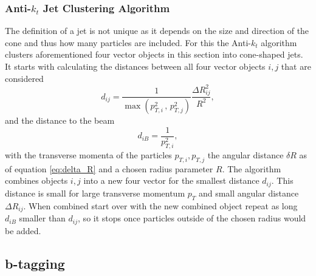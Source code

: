 \subsubsection*{Anti-$k_t$ Jet Clustering Algorithm}
The definition of a jet is not unique as it depends on the size and direction of the cone and thus how many particles are included. For this the Anti-$k_t$ algorithm \citep{cacciari2008anti} clusters aforementioned four vector objects in this section into cone-shaped jets. It starts with calculating the distances between all four vector objects $i,j$ that are considered
\begin{equation}
    d_{ij}=\frac{1}{\max(p_{T,i}^{2}\,,\,p_{T,j}^{2})} \frac{\Delta R_{ij}^2}{R^2},
\end{equation}
and the distance to the beam 
\begin{equation}
    d_{iB}=\frac{1}{p_{T,i}^{2}},
\end{equation}
with the transverse momenta of the particles $p_{T,i},p_{T,j}$ the angular distance $\delta R$ as of equation \ref{eq:delta_R} and a chosen radius parameter $R$. The algorithm combines objects $i,j$ into a new four vector for the smallest distance $d_{ij}$. This distance is small for large transverse momentum $p_T$ and small angular distance $\Delta R_{ij}$. When combined start over with the new combined object repeat as long $d_{iB}$ smaller than $d_{ij}$, so it stops once particles outside of the chosen radius would be added.

\subsection{b-tagging}\label{sec:b_tagging}




